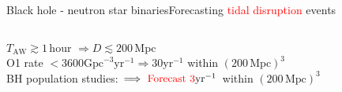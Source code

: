 \documentclass[xcolor=dvipsnames,t]{beamer}
\newcommand{\red}[1]{\textcolor{red}{#1}}
\begin{document}
\begin{frame}{Black hole - neutron star binaries}{Forecasting \red{tidal disruption} events}
\begin{footnotesize}
\begin{table}[h]
\begin{tabular}{lccccc}
  \hline\hline
  \end{tabular}
  \end{table}
  \end{footnotesize}
  $T_\text{AW} \gtrsim 1\,$hour $\Longrightarrow D \lesssim 200\,$Mpc \\
  O1 rate $ < 3600 \text{Gpc}^{-3}\text{yr}^{-1} \Longrightarrow 30\text{yr}^{-1}$ within $(200\,\text{Mpc})^3$ \\
  BH population studies: $\Longrightarrow \text{ \red{Forecast} } \red{3}\text{yr}^{-1}$ within $(200\,\text{Mpc})^3$
\end{frame}
\end{document}
